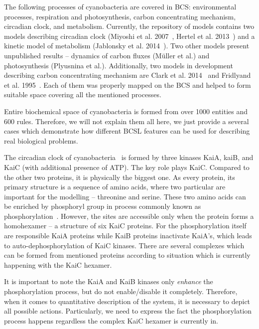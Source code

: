 \documentclass[12pt]{fithesis2}
\begin{document}
The following processes of cyanobacteria are covered in BCS: environmental processes, respiration and photosynthesis, carbon concentrating mechanism, circadian clock, and metabolism. Currently, the repository of models contains two models describing circadian clock (Miyoshi et al. 2007~\cite{Miyoshi01022007}, Hertel et al. 2013~\cite{Hertel2013}) and a kinetic model of metabolism (Jablonsky et al. 2014~\cite{Jablonsky2014}). Two other models present unpublished results -- dynamics of carbon fluxes (M\"{u}ller et al.) and photosynthesis (Plyusnina et al.). Additionally, two models in development describing carbon concentrating mechanism are Clark et al. 2014~\cite{clark2014insights} and Fridlyand et al. 1995~\cite{fridlyand1996quantitative}. Each of them was properly mapped on the BCS and helped to form suitable space covering all the mentioned processes.

Entire biochemical space of cyanobacteria is formed from over 1000 entities and 600 rules. Therefore, we will not explain them all here, we just provide a several cases which demonstrate how different BCSL features can be used for describing real biological problems.

The circadian clock of cyanobacteria~\cite{CCR} is formed by three kinases KaiA, kaiB, and KaiC (with additional presence of ATP). The key role plays KaiC. Compared to the other two proteins, it is physically the biggest one. As every protein, its primary structure is a sequence of amino acids, where two particular are important for the modelling -- threonine and serine. These two amino acids can be enriched by phosphoryl group in process commonly known as phosphorylation~\cite{cohen2002origins}. However, the sites are accessible only when the protein forms a homohexamer -- a structure of six KaiC proteins. For the phosphorylation itself are responsible KaiA proteins while KaiB proteins inactivate KaiA's, which leads to auto-dephosphorylation of KaiC kinases. There are several complexes which can be formed from mentioned proteins according to situation which is currently happening with the KaiC hexamer.

It is important to note the KaiA and KaiB kinases only \emph{enhance} the phosphorylation process, but do not enable/disable it completely. Therefore, when it comes to quantitative description of the system, it is necessary to depict all possible actions. Particularly, we need to express the fact the phosphorylation process happens regardless the complex KaiC hexamer is currently in. 
\end{document}
